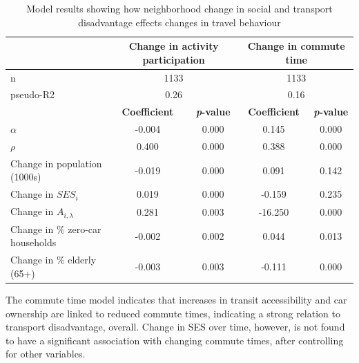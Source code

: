 \begin{table}[h]
	\small
	
	\caption{{Model results showing how neighborhood change in social and transport disadvantage effects changes in travel behaviour}}
	\label{table:model}
	\begin{adjustwidth}{-1in}{-1in}
		
		\centering
	\begin{tabular}{lcccc}
		\hline
		& \multicolumn{2}{c}{\textbf{Change in activity participation}} & \multicolumn{2}{c}{\textbf{Change in commute time}} \\
		\hline
		n                & \multicolumn{2}{c}{1133}      & \multicolumn{2}{c}{1133}       \\
		pseudo-R2               & \multicolumn{2}{c}{0.26}      & \multicolumn{2}{c}{0.16}       \\
		\hline
		& \textbf{Coefficient}      & \textbf{\textit{p}-value}         & \textbf{Coefficient}     & \textbf{\textit{p}-value}         \\
		\hline
		$\alpha$ & -0.004           & 0.000     & 0.145           & 0.000     \\
		$\rho$      & 0.400            & 0.000     & 0.388           & 0.000     \\
		Change in population (1000s)      & -0.019           & 0.000     & 0.091           & 0.142     \\
		Change in $SES_i$      & 0.019            & 0.000     & -0.159          & 0.235     \\
		Change in $A_{i,\lambda}$       & 0.281            & 0.003     & -16.250         & 0.000     \\
		Change in \% zero-car households   & -0.002           & 0.002     & 0.044           & 0.013     \\
		Change in \% elderly (65+)  & -0.003           & 0.003     & -0.111         & 0.000    \\
		\hline
	\end{tabular}

	\end{adjustwidth}
\end{table}

The commute time model indicates that increases in transit accessibility and car ownership are linked to reduced commute times, indicating a strong relation to transport disadvantage, overall. Change in SES over time, however, is not found to have a significant association with changing commute times, after controlling for other variables. 


